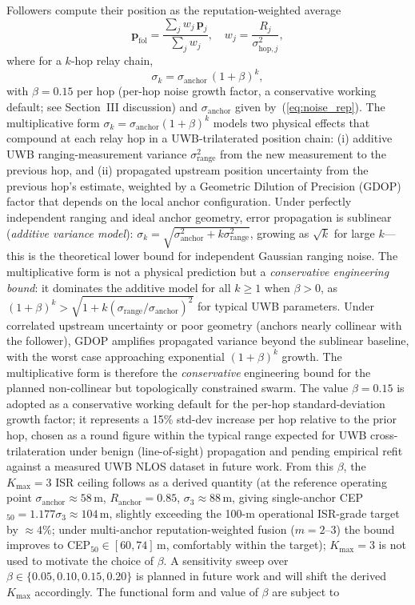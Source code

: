\documentclass[journal,10pt,twocolumn]{IEEEtran}
\begin{document}
Followers compute their position as the reputation-weighted average
\begin{equation}
\mathbf{p}_\text{fol} = \frac{\sum_j w_j\, \mathbf{p}_j}{\sum_j w_j}, \quad w_j = \frac{R_j}{\sigma_{\text{hop},j}^2},
\label{eq:fusion}
\end{equation}
where for a $k$-hop relay chain,
\begin{equation}
\sigma_k = \sigma_\text{anchor}\, (1 + \beta)^k,
\label{eq:hop}
\end{equation}
with $\beta = 0.15$ per hop (per-hop noise growth factor, a conservative working default; see Section~III discussion) and $\sigma_\text{anchor}$ given by~(\ref{eq:noise_rep}). The multiplicative form $\sigma_k = \sigma_\text{anchor}(1+\beta)^k$ models two physical effects that compound at each relay hop in a UWB-trilaterated position chain: (i) additive UWB ranging-measurement variance $\sigma_\text{range}^2$ from the new measurement to the previous hop, and (ii) propagated upstream position uncertainty from the previous hop's estimate, weighted by a Geometric Dilution of Precision (GDOP) factor that depends on the local anchor configuration. Under perfectly independent ranging and ideal anchor geometry, error propagation is sublinear (\emph{additive variance model}): $\sigma_k = \sqrt{\sigma_\text{anchor}^2 + k\sigma_\text{range}^2}$, growing as $\sqrt{k}$ for large $k$---this is the theoretical lower bound for independent Gaussian ranging noise. The multiplicative form is not a physical prediction but a \emph{conservative engineering bound}: it dominates the additive model for all $k \geq 1$ when $\beta > 0$, as $(1+\beta)^k > \sqrt{1 + k(\sigma_\text{range}/\sigma_\text{anchor})^2}$ for typical UWB parameters. Under correlated upstream uncertainty or poor geometry (anchors nearly collinear with the follower), GDOP amplifies propagated variance beyond the sublinear baseline, with the worst case approaching exponential $(1+\beta)^k$ growth. The multiplicative form is therefore the \emph{conservative} engineering bound for the planned non-collinear but topologically constrained swarm. The value $\beta = 0.15$ is adopted as a conservative working default for the per-hop standard-deviation growth factor; it represents a 15\% std-dev increase per hop relative to the prior hop, chosen as a round figure within the typical range expected for UWB cross-trilateration under benign (line-of-sight) propagation and pending empirical refit against a measured UWB NLOS dataset in future work. From this $\beta$, the $K_\text{max}=3$ ISR ceiling follows as a derived quantity (at the reference operating point $\sigma_\text{anchor}\approx 58$\,m, $R_\text{anchor}=0.85$, $\sigma_3 \approx 88$\,m, giving single-anchor CEP$_{50}=1.177\sigma_3 \approx 104$\,m, slightly exceeding the 100-m operational ISR-grade target by $\approx 4\%$; under multi-anchor reputation-weighted fusion ($m{=}2$--$3$) the bound improves to CEP$_{50}\in[60,74]$\,m, comfortably within the target); $K_\text{max}=3$ is not used to motivate the choice of $\beta$. A sensitivity sweep over $\beta \in \{0.05, 0.10, 0.15, 0.20\}$ is planned in future work and will shift the derived $K_\text{max}$ accordingly. The functional form and value of $\beta$ are subject to 
\end{document}
